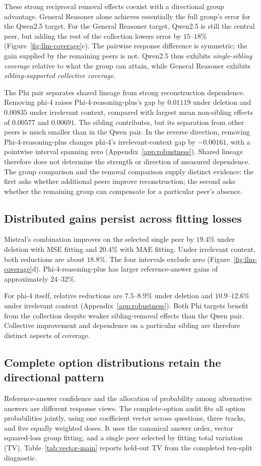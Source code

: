 These strong reciprocal removal effects coexist with a directional group advantage. General Reasoner alone achieves essentially the full group's error for the Qwen2.5 target. For the General Reasoner target, Qwen2.5 is still the central peer, but adding the rest of the collection lowers error by $15$--$18\%$ (Figure~\ref{fig:llm-coverage}c). The pairwise response difference is symmetric; the gain supplied by the remaining peers is not. Qwen2.5 thus exhibits \emph{single-sibling coverage} relative to what the group can attain, while General Reasoner exhibits \emph{sibling-supported collective coverage}.

The Phi pair separates shared lineage from strong reconstruction dependence. Removing phi-4 raises Phi-4-reasoning-plus's gap by $0.01119$ under deletion and $0.00835$ under irrelevant context, compared with largest mean non-sibling effects of $0.00577$ and $0.00691$. The sibling contributes, but its separation from other peers is much smaller than in the Qwen pair. In the reverse direction, removing Phi-4-reasoning-plus changes phi-4's irrelevant-context gap by $-0.00161$, with a pointwise interval spanning zero (Appendix~\ref{app:robustness}). Shared lineage therefore does not determine the strength or direction of measured dependence. The group comparison and the removal comparison supply distinct evidence: the first asks whether additional peers improve reconstruction; the second asks whether the remaining group can compensate for a particular peer's absence.

\subsection{Distributed gains persist across fitting losses}
Mistral's combination improves on the selected single peer by $19.4\%$ under deletion with MSE fitting and $20.4\%$ with MAE fitting. Under irrelevant context, both reductions are about $18.8\%$. The four intervals exclude zero (Figure~\ref{fig:llm-coverage}d). Phi-4-reasoning-plus has larger reference-answer gains of approximately $24$--$32\%$.

For phi-4 itself, relative reductions are $7.5$--$8.9\%$ under deletion and $10.9$--$12.6\%$ under irrelevant context (Appendix~\ref{app:robustness}). Both Phi targets benefit from the collection despite weaker sibling-removal effects than the Qwen pair. Collective improvement and dependence on a particular sibling are therefore distinct aspects of coverage.

\subsection{Complete option distributions retain the directional pattern}
Reference-answer confidence and the allocation of probability among alternative answers are different response views. The complete-option audit fits all option probabilities jointly, using one coefficient vector across questions, three tracks, and five equally weighted doses. It uses the canonical answer order, vector squared-loss group fitting, and a single peer selected by fitting total variation (TV). Table~\ref{tab:vector-main} reports held-out TV from the completed ten-split diagnostic.

